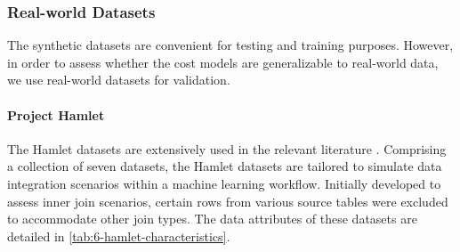 \subsubsection{Real-world Datasets}
The synthetic datasets are convenient for testing and training purposes. However, in order to assess whether the cost models are generalizable to real-world data, we use real-world datasets for validation.

\paragraph{Project Hamlet \cite{2016-hamlet-sigmod}}
The Hamlet datasets are extensively used in the relevant literature \cite{2016-hamlet-sigmod, amalur, morpheus,orion_learning_gen_lin_models}. Comprising a collection of seven datasets, the Hamlet datasets are tailored to simulate data integration scenarios within a machine learning workflow. Initially developed to assess inner join scenarios, certain rows from various source tables were excluded to accommodate other join types. The data attributes of these datasets are detailed in \autoref{tab:6-hamlet-characteristics}.

